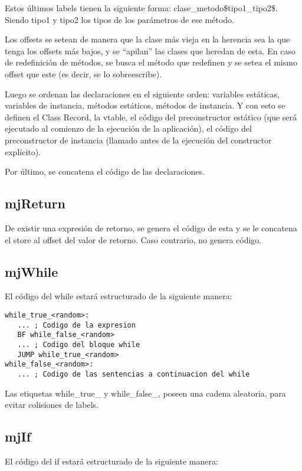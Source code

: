 \documentclass [a4paper,abstracton,titlepage]{scrartcl}
\begin{document}
Estos últimos labels tienen la siguiente forma: clase\_metodo\$tipo1\_tipo2\$. Siendo tipo1 y tipo2 los tipos de los parámetros de ese método.

Los offsets se setean de manera que la clase más vieja en la herencia sea la que tenga los offsets más bajos, y se ``apilan'' las clases que heredan de esta. En caso de redefinición de métodos, se busca el método que redefinen y se setea el mismo offset que este (es decir, se lo sobreescribe).

Luego se ordenan las declaraciones en el siguiente orden: variables estáticas, variables de instancia, métodos estáticos, métodos de instancia. Y con esto se definen el Class Record, la vtable, el código del preconstructor estático (que será ejecutado al comienzo de la ejecución de la aplicación), el código del preconstructor de instancia (llamado antes de la ejecución del constructor explícito). 

Por último, se concatena el código de las declaraciones.

  \subsection{mjReturn}

De existir una expresión de retorno, se genera el código de esta y se le concatena el store al offset del valor de retorno. Caso contrario, no genera código.

  \subsection{mjWhile}

El código del while estará estructurado de la siguiente manera:

  \begin{lstlisting}
while_true_<random>:
   ... ; Codigo de la expresion
   BF while_false_<random>
   ... ; Codigo del bloque while
   JUMP while_true_<random>
while_false_<random>:
   ... ; Codigo de las sentencias a continuacion del while
  \end{lstlisting}

Las etiquetas while\_true\_ y while\_false\_, poseen una cadena aleatoria, para
evitar colisiones de labels.

  \subsection{mjIf}

El código del if estará estructurado de la siguiente manera:
\end{document}
